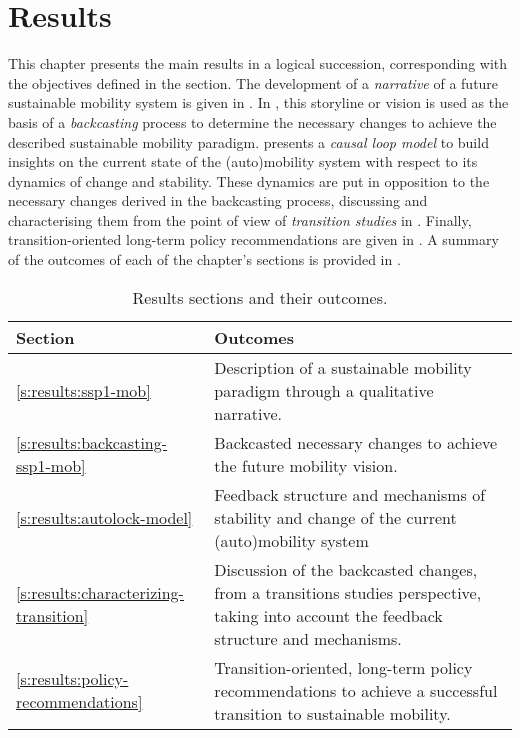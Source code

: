 \chapter{Results}
\label{c:results}

This chapter presents the main results in a logical succession, corresponding with the objectives defined in the  section. The development of a \textit{narrative} of a future sustainable mobility system is given in . In , this storyline or vision is used as the basis of a \textit{backcasting} process to determine the necessary changes to achieve the described sustainable mobility paradigm.  presents a \textit{causal loop model} to build insights on the current state of the (auto)mobility system with respect to its dynamics of change and stability. These dynamics are put in opposition to the necessary changes derived in the backcasting process, discussing and characterising them from the point of view of \textit{transition studies} in . Finally, transition-oriented long-term policy recommendations are given in . A summary of the outcomes of each of the chapter's sections is provided in .

\begin{table}[h]
\centering
\caption[Results sections and their outcomes]{Results sections and their outcomes.}
\label{t:results-sections}
\footnotesize
\begin{tabular}{p{7cm}p{7cm}}
\toprule
Section & Outcomes\\
\midrule
\ref{s:results:ssp1-mob} \nameref*{s:results:ssp1-mob} & Description of a sustainable mobility paradigm through a qualitative narrative.\\\addlinespace
\ref{s:results:backcasting-ssp1-mob} \nameref*{s:results:backcasting-ssp1-mob} & Backcasted necessary changes to achieve the future mobility vision. \\\addlinespace
\ref{s:results:autolock-model} \nameref*{s:results:autolock-model} & Feedback structure and mechanisms of stability and change of the current (auto)mobility system \\\addlinespace
\ref{s:results:characterizing-transition} \nameref*{s:results:characterizing-transition} & Discussion of the backcasted changes, from a transitions studies perspective, taking into account the feedback structure and mechanisms. \\\addlinespace
\ref{s:results:policy-recommendations} \nameref*{s:results:policy-recommendations} & Transition-oriented, long-term policy recommendations to achieve a successful transition to sustainable mobility.\\
\bottomrule
\end{tabular}
\end{table}


